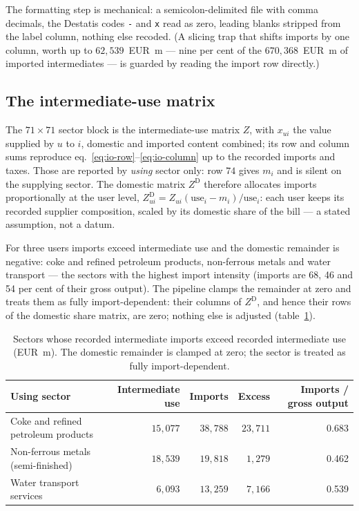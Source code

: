 The formatting step is mechanical: a semicolon-delimited file with comma
decimals, the Destatis codes \texttt{-} and \texttt{x} read as zero, leading
blanks stripped from the label column, nothing else recoded. (A slicing trap
that shifts imports by one column, worth up to $62{,}539$~EUR~m --- nine per cent
of the $670{,}368$~EUR~m of imported intermediates --- is guarded by reading the
import row directly.)

\subsection{The intermediate-use matrix}\label{app:pipeline-z}

The $71\times71$ sector block is the intermediate-use matrix $Z$, with $x_{ui}$
the value supplied by $u$ to $i$, domestic and imported content combined; its
row and column sums reproduce eq.~\eqref{eq:io-row}--\eqref{eq:io-column} up to
the recorded imports and taxes. Those are reported by \emph{using} sector only:
row $74$ gives $m_i$ and is silent on the supplying sector. The domestic matrix $Z^{\mathrm{D}}$ therefore allocates imports
proportionally at the user level,
$Z^{\mathrm{D}}_{ui}=Z_{ui}(\text{use}_i-m_i)/\text{use}_i$: each user keeps its
recorded supplier composition, scaled by its domestic share of the bill --- a
stated assumption, not a datum.

For three users imports exceed intermediate use and the domestic remainder is
negative: coke and refined petroleum products, non-ferrous metals and water
transport --- the sectors with the highest import intensity (imports are 68, 46
and 54 per cent of their gross output). The pipeline clamps the remainder at
zero and treats them as fully import-dependent: their columns of
$Z^{\mathrm{D}}$, and hence their rows of the domestic share matrix, are zero;
nothing else is adjusted (table~\ref{tab:pipeline-clamp}).

\begin{table}[t]
\centering
\caption{Sectors whose recorded intermediate imports exceed recorded intermediate use (EUR~m). The domestic remainder is clamped at zero; the sector is treated as fully import-dependent.}
\label{tab:pipeline-clamp}
\small
\begin{tabular}{lrrrr}
\toprule
Using sector & Intermediate use & Imports & Excess & Imports / gross output \\
\midrule
Coke and refined petroleum products & $15{,}077$ & $38{,}788$ & $23{,}711$ & 0.683 \\
Non-ferrous metals (semi-finished) & $18{,}539$ & $19{,}818$ & $1{,}279$ & 0.462 \\
Water transport services & $6{,}093$ & $13{,}259$ & $7{,}166$ & 0.539 \\
\bottomrule
\end{tabular}
\end{table}

